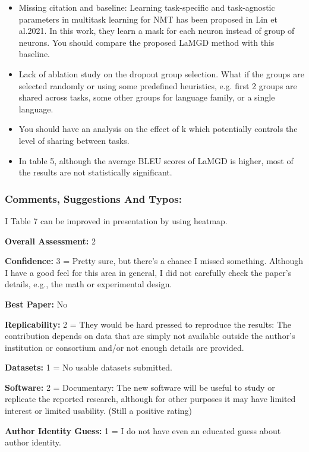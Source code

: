 \documentclass[12pt,times,a4paper,twoside]{article}
\theoremstyle{definition}
\begin{document}
\begin{itemize}
\item Missing citation and baseline: Learning task-specific and task-agnostic parameters in multitask learning for NMT has been proposed in Lin et al.2021. In this work, they learn a mask for each neuron instead of group of neurons. You should compare the proposed LaMGD method with this baseline.
\item Lack of ablation study on the dropout group selection. What if the groups are selected randomly or using some predefined heuristics, e.g. first 2 groups are shared across tasks, some other groups for language family, or a single language.

\item You should have an analysis on the effect of k which potentially controls the level of sharing between tasks.

\item In table 5, although the average BLEU scores of LaMGD is higher, most of the results are not statistically significant.
  \end{itemize}

\subsubsection*{Comments, Suggestions And Typos:}

I Table 7 can be improved in presentation by using heatmap.

\textbf{Overall Assessment:} 2

\textbf{Confidence:} 3 =  Pretty sure, but there's a chance I missed something. Although I have a good feel for this area in general, I did not carefully check the paper's details, e.g., the math or experimental design.

\textbf{Best Paper:} No

\textbf{Replicability:} 2 = They would be hard pressed to reproduce the results: The contribution depends on data that are simply not available outside the author's institution or consortium and/or not enough details are provided.

\textbf{Datasets:} 1 = No usable datasets submitted.

\textbf{Software:} 2 = Documentary: The new software will be useful to study or replicate the reported research, although for other purposes it may have limited interest or limited usability. (Still a positive rating)

\textbf{Author Identity Guess:} 1 = I do not have even an educated guess about author identity.
\end{document}
